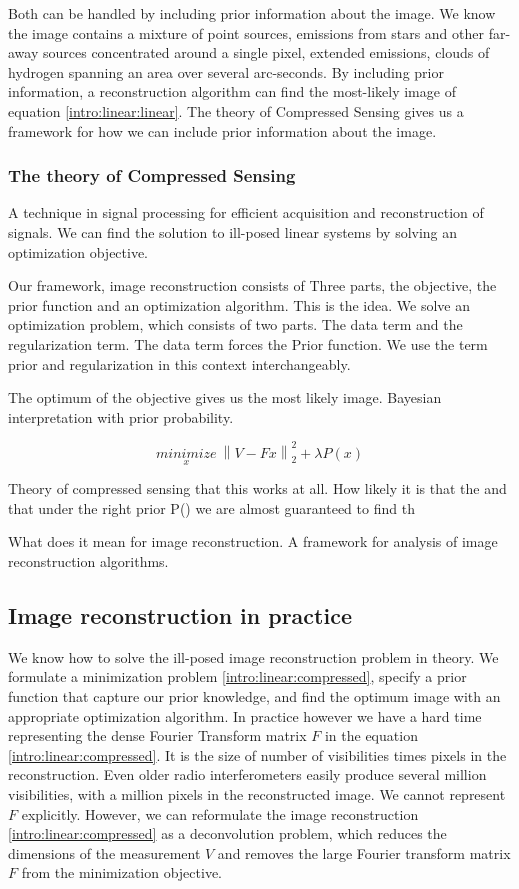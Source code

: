 Both can be handled by including prior information about the image. We know the image contains a mixture of point sources, emissions from stars and other far-away sources concentrated around a single pixel, extended emissions, clouds of hydrogen spanning an area over several arc-seconds. By including prior information, a reconstruction algorithm can find the most-likely image of equation \eqref{intro:linear:linear}. The theory of Compressed Sensing\cite{candes2006robust,donoho2006compressed} gives us a framework for how we can include prior information about the image. 

\subsubsection{The theory of Compressed Sensing}
A technique in signal processing for efficient acquisition and reconstruction of signals. We can find the solution to ill-posed linear systems by solving an optimization objective. 

Our framework, image reconstruction consists of Three parts, the objective, the prior function and an optimization algorithm.
This is the idea. We solve an optimization problem, which consists of two parts. The data term and the regularization term. The data term forces the 
Prior function. We use the term prior and regularization in this context interchangeably.

The optimum of the objective gives us the most likely image. Bayesian interpretation with prior probability.

\begin{equation}\label{intro:linear:compressed}
\underset{x}{minimize} \: \left \| V - Fx \right \|_2^2 + \lambda P(x)
\end{equation}


Theory of compressed sensing that this works at all. How likely it is that the and that under the right prior P() we are almost guaranteed to find th

What does it mean for image reconstruction. A framework for analysis of image reconstruction algorithms.


\subsection{Image reconstruction in practice}\label{intro:major}
We know how to solve the ill-posed image reconstruction problem in theory. We formulate a minimization problem \eqref{intro:linear:compressed}, specify a prior function that capture our prior knowledge, and find the optimum image with an appropriate optimization algorithm. In practice however we have a hard time representing the dense Fourier Transform matrix $F$ in the equation \eqref{intro:linear:compressed}. It is the size of number of visibilities times pixels in the reconstruction. Even older radio interferometers easily produce several million visibilities, with a million pixels in the reconstructed image. We cannot represent $F$ explicitly. However, we can reformulate the image reconstruction \eqref{intro:linear:compressed} as a deconvolution problem, which reduces the dimensions of the measurement $V$ and removes the large Fourier transform matrix $F$ from the minimization objective.

